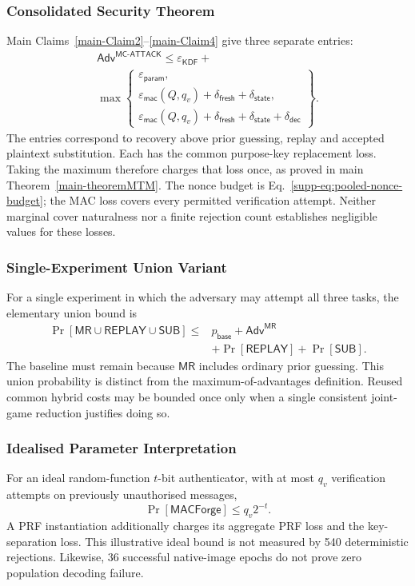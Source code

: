 \documentclass[journal]{IEEEtran}
\theoremstyle{definition}
\theoremstyle{game}
\begin{document}
\subsubsection{Consolidated Security Theorem}
Main Claims~\ref{main-Claim2}--\ref{main-Claim4} give three separate entries:
\begin{equation}
\begin{gathered}
\mathsf{Adv}^{\mathsf{MC\text{-}ATTACK}}
\le\varepsilon_{\mathsf{KDF}}+\\
\max\left\{
\begin{array}{l}
\varepsilon_{\mathsf{param}},\\
\varepsilon_{\mathsf{mac}}(Q,q_v)+\delta_{\mathsf{fresh}}+\delta_{\mathsf{state}},\\
\varepsilon_{\mathsf{mac}}(Q,q_v)+\delta_{\mathsf{fresh}}+\delta_{\mathsf{state}}+\delta_{\mathsf{dec}}
\end{array}\right\}.
\end{gathered}
\end{equation}
The entries correspond to recovery above prior guessing, replay and accepted
plaintext substitution. Each has the common purpose-key replacement loss.
Taking the maximum therefore charges that loss once, as proved in main
Theorem~\ref{main-theoremMTM}. The nonce budget is
Eq.~\eqref{supp-eq:pooled-nonce-budget}; the MAC loss covers every permitted
verification attempt. Neither marginal cover naturalness nor a finite
rejection count establishes negligible values for these losses.

\subsubsection{Single-Experiment Union Variant}
For a single experiment in which the adversary may attempt all three tasks,
the elementary union bound is
\begin{align}
\Pr[\mathsf{MR}\cup\mathsf{REPLAY}\cup\mathsf{SUB}]
\le{}&p_{\mathsf{base}}+\mathsf{Adv}^{\mathsf{MR}}\nonumber\\
&+\Pr[\mathsf{REPLAY}]+\Pr[\mathsf{SUB}].
\end{align}
The baseline must remain because $\mathsf{MR}$ includes ordinary prior
guessing. This union probability is distinct from the maximum-of-advantages
definition. Reused common hybrid costs may be bounded once only when a
single consistent joint-game reduction justifies doing so.

\subsubsection{Idealised Parameter Interpretation}
For an ideal random-function $t$-bit authenticator, with at most $q_v$
verification attempts on previously unauthorised messages,
\[
\Pr[\mathsf{MACForge}]\le q_v2^{-t}.
\]
A PRF instantiation additionally charges its aggregate PRF loss and the
key-separation loss. This illustrative ideal bound is not measured by
540 deterministic rejections. Likewise, 36 successful native-image epochs
do not prove zero population decoding failure.
\end{document}
